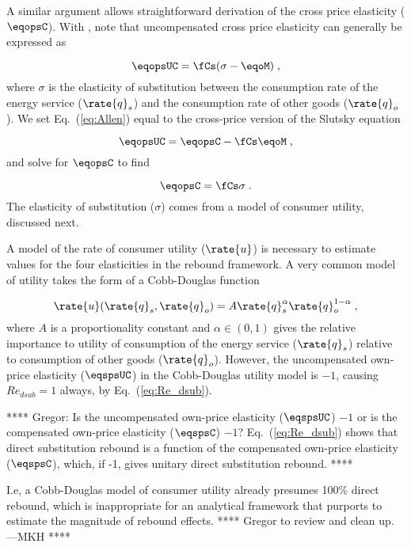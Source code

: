 A similar argument allows straightforward derivation 
of the cross price elasticity ($\eqopsC$).
With \citet{Hicks1934}, 
note that uncompensated cross price elasticity can generally be expressed as

\begin{equation} \label{eq:Allen}
  \eqopsUC = \fCs (\sigma - \eqoM) \; ,
\end{equation}
%
where $\sigma$ is the elasticity of substitution 
between the consumption rate of the energy service ($\rate{q}_s$) and
the consumption rate of other goods ($\rate{q}_o$). 
We set Eq.~(\ref{eq:Allen}) equal to 
the cross-price version of the Slutsky equation

\begin{equation} \label{eq:slutsky_cross}
  \eqopsUC = \eqopsC - \fCs \eqoM \; ,
\end{equation}
%
and solve for $\eqopsC$ to find

\begin{equation} \label{eq:eqops_general}
  \eqopsC = \fCs \sigma \; .
\end{equation}
%
The elasticity of substitution ($\sigma$)
comes from a model of consumer utility, discussed next.

A model of the rate of consumer utility ($\rate{u}$)
is necessary to estimate values for the four elasticities
in the rebound framework.
A very common model of utility takes the form of a Cobb-Douglas function

\begin{equation} \label{eq:CD_utility}
  \rate{u}(\rate{q}_s,\rate{q}_o) = A \rate{q}_s^\alpha \rate{q}_o^{1 - \alpha} \; ,
\end{equation}
%
where $A$ is a proportionality constant and
$\alpha \in (0,1)$ gives the relative importance to utility
of consumption of the energy service ($\rate{q}_s$)
relative to consumption of other goods ($\rate{q}_o$).
However, the uncompensated own-price elasticity ($\eqspsUC$)
in the Cobb-Douglas utility model is $-1$,
causing $Re_{dsub} = 1$ always,
by Eq.~(\ref{eq:Re_dsub}).

**** Gregor: Is the uncompensated own-price elasticity ($\eqspsUC$) $-1$
or is the compensated own-price elasticity ($\eqspsC$) $-1$?
Eq.~(\ref{eq:Re_dsub}) shows that direct substitution rebound is a function of the
compensated own-price elasticity ($\eqspsC$), which, if -1, gives unitary direct substitution rebound.
****

I.e, a Cobb-Douglas model of consumer utility already presumes 100\% direct rebound,
which is inappropriate for an analytical framework that purports to
estimate the magnitude of rebound effects.
**** Gregor to review and clean up. ---MKH ****

